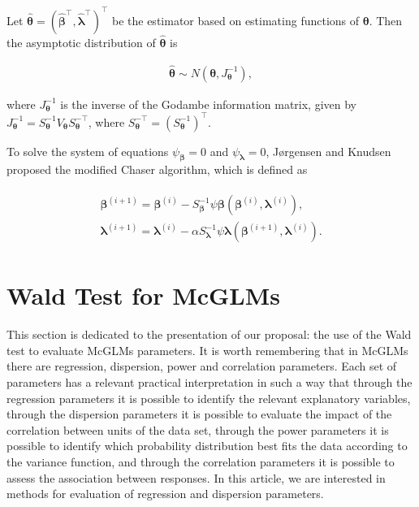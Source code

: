 \documentclass[AMA,STIX1COL]{WileyNJD-v2}
\begin{document}
Let $\boldsymbol{\hat{\theta}} = (\boldsymbol{\hat{\beta}^{\top}}, \boldsymbol{\hat{\lambda}^{\top}})^{\top }$ be the estimator based on estimating functions of $\boldsymbol{\theta}$. Then the asymptotic distribution of $\boldsymbol{\hat{\theta}}$ is

$$
  \begin{aligned}
    \boldsymbol{\hat{\theta}} \sim N(\boldsymbol{\theta}, J_{\boldsymbol{\theta}}^{-1}),
  \end{aligned}
$$

\noindent where $J_{\boldsymbol{\theta}}^{-1}$ is the inverse of the Godambe information matrix, given by $J_{\boldsymbol{\theta}}^{-1} = S_{ \boldsymbol{\theta}}^{-1} V_{\boldsymbol{\theta}} S_{\boldsymbol{\theta}}^{-\top}$, where $S_{\boldsymbol{\theta}} ^{-\top} = (S_{\boldsymbol{\theta}}^{-1})^{\top}.$

To solve the system of equations $\psi_{\boldsymbol{\beta}} = 0$ and $\psi_{\boldsymbol{\lambda}} = 0$, Jørgensen and Knudsen \cite{jorg04} proposed the modified Chaser algorithm, which is defined as

$$
\begin{aligned}
\begin{matrix}
\boldsymbol{\beta}^{(i+1)} = \boldsymbol{\beta}^{(i)}- S_{\boldsymbol{\beta}}^{-1} \psi \boldsymbol{\beta} (\boldsymbol{\beta}^{(i)}, \boldsymbol{\lambda}^{(i)}), \\ 
\boldsymbol{\lambda}^{(i+1)} = \boldsymbol{\lambda}^{(i)} - \alpha S_{\boldsymbol{\lambda}}^{-1} \psi \boldsymbol{\lambda} (\boldsymbol{\beta}^{(i+1)}, \boldsymbol{\lambda}^{(i)}).
\end{matrix}
\end{aligned}
$$


\section{Wald Test for McGLMs}\label{sec4}

This section is dedicated to the presentation of our proposal: the use of the Wald test to evaluate McGLMs parameters. It is worth remembering that in McGLMs there are regression, dispersion, power and correlation parameters. Each set of parameters has a relevant practical interpretation in such a way that through the regression parameters it is possible to identify the relevant explanatory variables, through the dispersion parameters it is possible to evaluate the impact of the correlation between units of the data set, through the power parameters it is possible to identify which probability distribution best fits the data according to the variance function, and through the correlation parameters it is possible to assess the association between responses. In this article, we are interested in methods for evaluation of regression and dispersion parameters.
\end{document}
